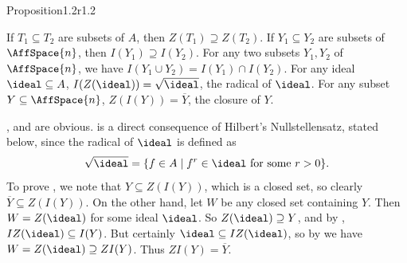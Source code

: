 {\begin{result}{Proposition}{1.2}{r1.2}
\begin{parts}
 If $T_1\subseteq T_2$ are subsets of $A$, then $Z(T_1)\supseteq Z(T_2)$.
 If $Y_1\subseteq Y_2$ are subsets of $\AffSpace{n}$, then $I(Y_1)\supseteq I(Y_2)$.
 For any two subsets $Y_1,Y_2$ of $\AffSpace{n}$, we have $I(Y_1\cup Y_2)=I(Y_1)\cap I(Y_2)$.
 For any ideal $\ideal\subseteq A$, $I(Z(\ideal))=\sqrt{\ideal}$, the radical of $\ideal$.
 For any subset $Y\subseteq\AffSpace{n}$, $Z(I(Y))=\overline Y$, the closure of $Y$.
\end{parts}
\end{result}
\Proof {},  and  are obvious.  is a direct consequence of Hilbert's Nullstellensatz, stated below, since the radical of $\ideal$ is defined as
\[
\sqrt{\ideal}=\{f\in A\mid f^r\in\ideal\text{ for some }r>0\}.
\]
To prove , we note that $Y\subseteq Z(I(Y))$, which is a closed set, so clearly $\overline Y\subseteq Z(I(Y))$. On the other hand, let $W$ be any closed set containing $Y$. Then $W=Z(\ideal)$ for some ideal $\ideal$. So $Z(\ideal)\supseteq Y$, and by , $IZ(\ideal)\subseteq I(Y)$. But certainly $\ideal\subseteq IZ(\ideal)$, so by  we have $W=Z(\ideal)\supseteq ZI(Y)$. Thus $ZI(Y)=\overline Y$.
}


